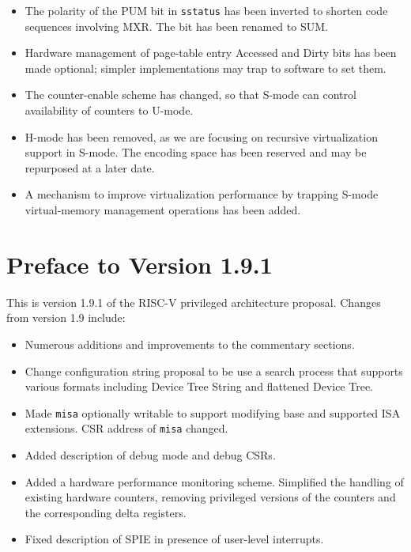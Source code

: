 \begin{itemize}
\item The polarity of the PUM bit in {\tt sstatus} has been inverted to
  shorten code sequences involving MXR.  The bit has been renamed to SUM.
\item Hardware management of page-table entry Accessed and Dirty bits has
  been made optional; simpler implementations may trap to software to
  set them.
\item The counter-enable scheme has changed, so that S-mode can
  control availability of counters to U-mode.
\item H-mode has been removed, as we are focusing on recursive
  virtualization support in S-mode.  The encoding space has been
  reserved and may be repurposed at a later date.
\item A mechanism to improve virtualization performance by
  trapping S-mode virtual-memory management operations has been added.
\end{itemize}

\newpage

\section*{Preface to Version 1.9.1}

This is version 1.9.1 of the RISC-V privileged architecture
proposal.  Changes from version 1.9 include:

\begin{itemize}
  \parskip 0pt
  \itemsep 1pt
\item Numerous additions and improvements to the commentary sections.
\item Change configuration string proposal to be use a search process
  that supports various formats including Device Tree String and
  flattened Device Tree.
\item Made {\tt misa} optionally writable to support modifying base
  and supported ISA extensions.  CSR address of {\tt misa} changed.
\item Added description of debug mode and debug CSRs.
\item Added a hardware performance monitoring scheme.  Simplified the
  handling of existing hardware counters, removing privileged versions
  of the counters and the corresponding delta registers.
\item Fixed description of SPIE in presence of user-level interrupts.
\end{itemize}
